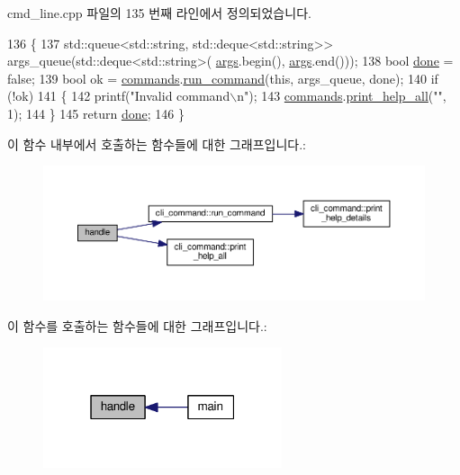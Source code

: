 cmd\+\_\+line.\+cpp 파일의 135 번째 라인에서 정의되었습니다.


\begin{DoxyCode}
136 \{
137     std::queue<std::string, std::deque<std::string>> args\_queue(std::deque<std::string>(
      \hyperlink{namespaceastime__fitline_a8187411843a6284ffb964ef3fb9fcab3}{args}.begin(), \hyperlink{namespaceastime__fitline_a8187411843a6284ffb964ef3fb9fcab3}{args}.end()));
138     \textcolor{keywordtype}{bool} \hyperlink{mrp_validate_8c_a5992b274cfdcacdbc1fa8347fd01ebde}{done} = \textcolor{keyword}{false};
139     \textcolor{keywordtype}{bool} ok = \hyperlink{classcmd__line_ae4fea670c2fdd2b60f7b5b6ad6fbaf1e}{commands}.\hyperlink{classcli__command_a8bd8ac0f5b50e8083f020aa0a88fba85}{run\_command}(\textcolor{keyword}{this}, args\_queue, done);
140     \textcolor{keywordflow}{if} (!ok)
141     \{
142         printf(\textcolor{stringliteral}{"Invalid command\(\backslash\)n"});
143         \hyperlink{classcmd__line_ae4fea670c2fdd2b60f7b5b6ad6fbaf1e}{commands}.\hyperlink{classcli__command_af4fd484e8365d1e440dd63ad8909599e}{print\_help\_all}(\textcolor{stringliteral}{""}, 1);
144     \}
145     \textcolor{keywordflow}{return} \hyperlink{mrp_validate_8c_a5992b274cfdcacdbc1fa8347fd01ebde}{done};
146 \}
\end{DoxyCode}


이 함수 내부에서 호출하는 함수들에 대한 그래프입니다.\+:
\nopagebreak
\begin{figure}[H]
\begin{center}
\leavevmode
\includegraphics[width=350pt]{classcmd__line_ac354d66fb914d572760863d0cefe8f99_cgraph}
\end{center}
\end{figure}




이 함수를 호출하는 함수들에 대한 그래프입니다.\+:
\nopagebreak
\begin{figure}[H]
\begin{center}
\leavevmode
\includegraphics[width=199pt]{classcmd__line_ac354d66fb914d572760863d0cefe8f99_icgraph}
\end{center}
\end{figure}


